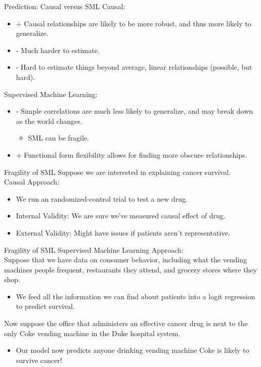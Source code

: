 \documentclass[11pt]{beamer}
\begin{document}
\begin{frame}[c]{Prediction: Causal versus SML}
  Causal:
  \begin{itemize}
    \item + Causal relationships are likely to be \alert{more robust}, and thus \alert{more likely to generalize}.
    \item - Much harder to estimate.
    \item - Hard to estimate things beyond average, linear relationships (possible, but hard).
  \end{itemize}
  Supervised Machine Learning:
  \begin{itemize}
    \item - Simple correlations are \alert{much less likely to generalize}, and may break down as the world changes.
    \begin{itemize}
      \item SML can be \alert{fragile.}
    \end{itemize}
    \item + Functional form flexibility allows for finding more obscure relationships.
  \end{itemize}
\end{frame}

\begin{frame}[c]{Fragility of SML}
\pause Suppose we are interested in explaining cancer survival. \\
\vspace{0.1cm}
Causal Approach:
\begin{itemize}
    \item We run an randomized-control trial to test a new drug.
    \item Internal Validity: We are sure we've measured causal effect of drug.
    \item External Validity: Might have issues if patients aren't representative.
  \end{itemize}
\end{frame}

\begin{frame}[c]{Fragility of SML}
  Supervised Machine Learning Approach: \\
Suppose that we have data on consumer behavior, including what the vending machines people frequent, restaurants they attend, and grocery stores where they shop.
  \begin{itemize}
    \pause \item We feed all the information we can find about patients into a logit regression to predict survival.
  \end{itemize}
\pause Now suppose the office that administers an effective cancer drug is next to the only Coke vending machine in the Duke hospital system.
\begin{itemize}
  \item Our model now predicts anyone drinking vending machine Coke is likely to survive cancer!
\end{itemize}
\end{frame}
\end{document}
